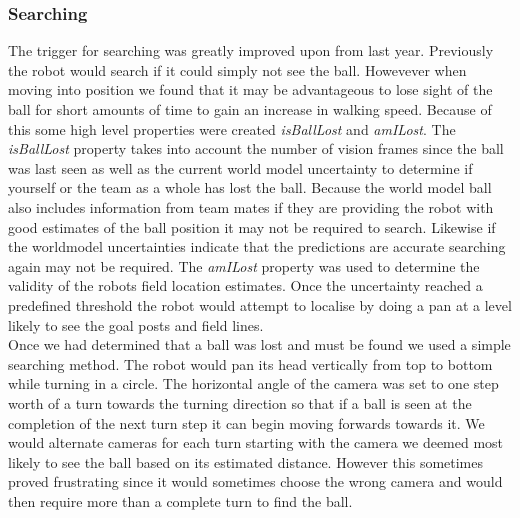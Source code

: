 \subsubsection{Searching}
The trigger for searching was greatly improved upon from last year. Previously the robot would search if it could simply not see the ball. Howevever when moving into position we found that it may be advantageous to lose sight of the ball for short amounts of time to gain an increase in walking speed. Because of this some high level properties were created \emph{isBallLost} and \emph{amILost}. The \emph{isBallLost} property takes into account the number of vision frames since the ball was last seen as well as the current world model uncertainty to determine if yourself or the team as a whole has lost the ball. Because the world model ball also includes information from team mates if they are providing the robot with good estimates of the ball position it may not be required to search. Likewise if the worldmodel uncertainties indicate that the predictions are accurate searching again may not be required. The \emph{amILost} property was used to determine the validity of the robots field location estimates. Once the uncertainty reached a predefined threshold the robot would attempt to localise by doing a pan at a level likely to see the goal posts and field lines.\\

Once we had determined that a ball was lost and must be found we used a simple searching method. The robot would pan its head vertically from top to bottom while turning in a circle. The horizontal angle of the camera was set to one step worth of a turn towards the turning direction so that if a ball is seen at the completion of the next turn step it can begin moving forwards towards it. We would alternate cameras for each turn starting with the camera we deemed most likely to see the ball based on its estimated distance. However this sometimes proved frustrating since it would sometimes choose the wrong camera and would then require more than a complete turn to find the ball.\\


